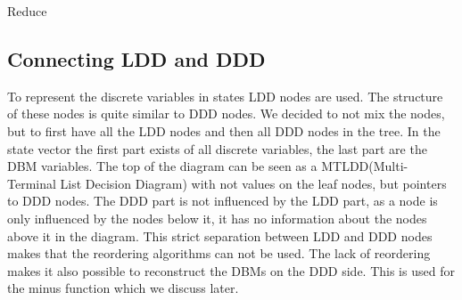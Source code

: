 \begin{algorithm}
\caption{Reduce}\label{alg:ReduceZero}
\begin{algorithmic}[1]
				\EndIf
			\EndFor
		\EndIf
	\EndFor
				\Break
			\EndIf
		\EndFor
	\EndFor
		\EndFor
	\EndFor
					\EndIf
				\EndFor
			\EndIf
		\EndFor
		\EndFor
	\EndFor
		
\EndProcedure
\end{algorithmic}
\end{algorithm}

\subsection{Connecting LDD and DDD}
To represent the discrete variables in states LDD nodes are used. The structure of these nodes is quite similar to DDD nodes. We decided to not mix the nodes, but to first have all the LDD nodes and then all DDD nodes in the tree. In the state vector the first part exists of all discrete variables, the last part are the DBM variables. The top of the diagram can be seen as a MTLDD(Multi-Terminal List Decision Diagram) with not values on the leaf nodes, but pointers to DDD nodes. The DDD part is not influenced by the LDD part, as a node is only influenced by the nodes below it, it has no information about the nodes above it in the diagram. This strict separation between LDD and DDD nodes makes that the reordering algorithms can not be used. The lack of reordering makes it also possible to reconstruct the DBMs on the DDD side. This is used for the minus function which we discuss later.

